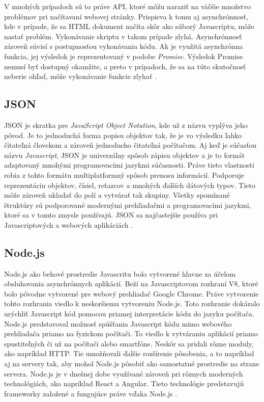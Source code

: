 V mnohých prípadoch sú to práve API, ktoré môžu naraziť na väčšie množstvo problémov pri načítavaní webovej stránky. Prispieva k tomu aj asynchrónnosť, kde v prípade, že sa HTML dokument načíta skôr ako súborý Javascriptu, môže nastať problém. Vykonávanie skriptu v takom prípade zlyhá. Asynchrónnosť zároveň súvisí s postupnosťou vykonávania kódu. Ak je využitá asynchrónna funkcia, jej výsledok je reprezentovaný v podobe \textit{Promise}. Výsledok Promise nemusí byť dostupný okamžite, a preto v prípadoch, že sa na túto skutočnosť neberie ohľad, môže vykonávanie funkcie zlyhať \cite{Javascript}.

\newpage
\subsection{JSON}

JSON je skratka pre \textit{JavaScript Object Notation}, kde už z názvu vyplýva jeho pôvod. Je to jednoduchá forma popisu objektov tak, že je vo výsledku ľahko čitateľná človekom a zároveň jednoducho čitateľná počítačom. Aj keď je súčasťou názvu \textit{Javascript}, JSON je univerzálny spôsob zápisu objektov a je to formát adaptovaný mnohými programovacími jazykmi súčasnosti. Práve tieto vlastnosti robia z tohto formátu multiplatformný spôsob prenosu informácií. Podporuje reprezentáciu objektov, čísiel, reťazcov a mnohých ďalších dátových typov. Tieto môže zároveň ukladať do polí a vytvárať tak skupiny. Všetky spomínané štruktúry sú podporované modernými prehliadačmi a programovacími jazykmi, ktoré sa v tomto zmysle používajú. JSON sa najčastejšie používa pri Javascriptových a webových aplikáciách \cite{JSON}.

\subsection{Node.js}

Node.js ako behové prostredie Javascritu bolo vytvorené hlavne za účelom obsluhovania asynchrónnych aplikácií. Beží na Javascriptovom rozhraní V8, ktoré bolo pôvodne vytvorené pre webový prehliadač Google Chrome. Práve vytvorenie tohto rozhrania viedlo k neskoršiemu vytvoreniu Node.js. Toto rozhranie dokázalo urýchliť Javascript kód pomocou priamej interpretácie kódu do jazyku počítača. Node.js predstavoval možnosť spúšťania Javascript kódu mimo webového prehliadača priamo na fyzickom počítači. To viedlo k vytváraniu aplikácií priamo spustiteľných či už na počítači alebo smartfóne. Neskôr sa pridali rôzne moduly, ako napríklad HTTP. Tie umožňovali ďalšie rozšírenie pôsobenia, a to napríklad aj na servery tak, aby mohol Node.js pôsobiť ako samostatné prostredie na strane servera. Node.js je v dnešnej dobe využívané zároveň pri rôznych moderných technológiách, ako napríklad React a Angular. Tieto technológie predstavujú frameworky založené a fungujúce práve vďaka Node.js \cite{Node}.

